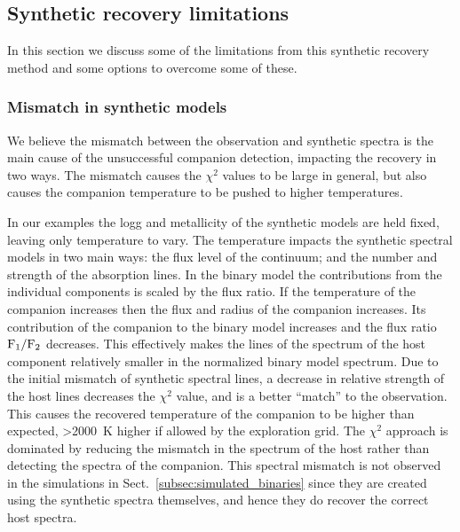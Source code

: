 \documentclass[fleqn,usenatbib]{mnras}
\begin{document}
\subsection{Synthetic recovery limitations}
\label{subsec:limitations}
In this section we discuss some of the limitations from this synthetic recovery method and some options to overcome some of these.

\subsubsection{Mismatch in synthetic models}
\label{subsubsec:mismatch}
We believe the mismatch between the observation and synthetic spectra is the main cause of the unsuccessful companion detection, impacting the recovery in two ways. The mismatch causes the \(\chi^2\) values to be large in general, but also causes the companion temperature to be pushed to higher temperatures. 

In our examples the logg and metallicity of the synthetic models are held fixed, leaving only temperature to vary. The temperature impacts the synthetic spectral models in two main ways: the flux level of the continuum; and the number and strength of the absorption lines. In the binary model the contributions from the individual components is scaled by the flux ratio. If the temperature of the companion increases then the flux and radius of the companion increases. Its contribution of the companion to the binary model increases and the flux ratio \(\rm F_1/F_2\) decreases. This effectively makes the lines of the spectrum of the host component relatively smaller in the normalized binary model spectrum. Due to the initial mismatch of synthetic spectral lines, a decrease in relative strength of the host lines decreases the \(\chi^2\) value, and is a better ``match'' to the observation. This causes the recovered temperature of the companion to be higher than expected, >2000~K higher if allowed by the exploration grid. The \(\chi^2\) approach is dominated by reducing the mismatch in the spectrum of the host rather than detecting the spectra of the companion.
This spectral mismatch is not observed in the simulations in Sect.~\ref{subsec:simulated_binaries} since they are created using the synthetic spectra themselves, and hence they do recover the correct host spectra. 
\end{document}
